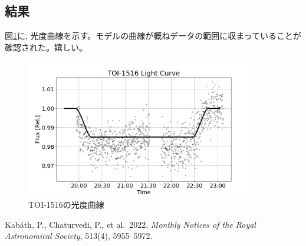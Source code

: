 \documentclass[dvipdfmx,a4paper]{jsarticle}
\begin{document}
\subsection{結果}
図\ref{fig:transit_model}に, 光度曲線を示す。モデルの曲線が概ねデータの範囲に収まっていることが確認された。嬉しい。

\begin{figure}[H]
  \centering
  \includegraphics[width=0.9\textwidth]{./fig/light_curve_fit.png}
  \caption{TOI-1516の光度曲線}
  \label{fig:transit_model}
\end{figure}

\begin{thebibliography}{9}
Kabáth, P., Chaturvedi, P., et al.\ 
2022, 
\textit{Monthly Notices of the Royal Astronomical Society}, 
513(4), 5955--5972.
\end{thebibliography}
\end{document}
